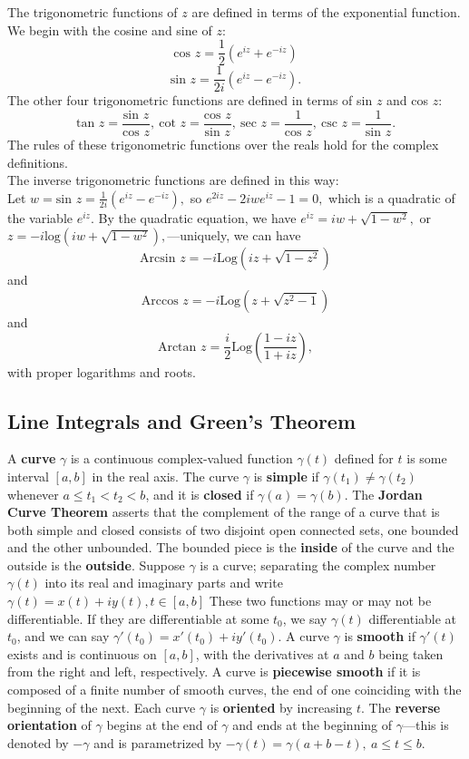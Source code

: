 \documentclass[12pt,letterpaper]{article}
\begin{document}
The trigonometric functions of \(z\) are defined in terms of the exponential function. We begin with the cosine and sine of \(z\): \[\text{cos } z = \frac{1}{2}(e^{iz} + e^{-iz})\] \[\text{sin } z = \frac{1}{2i}(e^{iz}-e^{-iz}).\] The other four trigonometric functions are defined in terms of sin \(z\) and cos \(z\): \[\text{tan } z= \frac{\text{sin } z}{\text{cos } z},\ \text{cot }z = \frac{\text{cos }z}{\text{sin }z},\ \text{sec }z = \frac{1}{\text{cos }z},\ \text{csc }z = \frac{1}{\text{sin }z}.\] The rules of these trigonometric functions over the reals hold for the complex definitions. \\

The inverse trigonometric functions are defined in this way: \\ 

Let \(w = \text{sin } z = \frac{1}{2i}(e^{iz} - e^{-iz}),\) so \(e^{2iz} - 2iwe^{iz} - 1 = 0,\) which is a quadratic of the variable \(e^{iz}\). By the quadratic equation, we have \(e^{iz} = iw + \sqrt{1-w^{2}},\) or \(z = -i\text{log}(iw + \sqrt{1-w^{2}}),\)---uniquely, we can have \[\text{Arcsin } z = -i\text{Log}(iz + \sqrt{1-z^{2}})\] and \[\text{Arccos } z = -i\text{Log}(z + \sqrt{z^{2} - 1})\] and \[\text{Arctan }z = \frac{i}{2}\text{Log}(\frac{1-iz}{1+iz}),\] with proper logarithms and roots.  

\subsection{Line Integrals and Green's Theorem}

A \textbf{curve} \(\gamma\) is a continuous complex-valued function \(\gamma(t)\) defined for \(t\) is some interval \([a,b]\) in the real axis. The curve \(\gamma\) is \textbf{simple} if \(\gamma(t_{1}) \neq \gamma(t_{2})\) whenever \(a \leq t_{1} < t_{2} < b\), and it is \textbf{closed} if \(\gamma(a) = \gamma(b)\). The \textbf{Jordan Curve Theorem} asserts that the complement of the range of a curve that is both simple and closed consists of two disjoint open connected sets, one bounded and the other unbounded. The bounded piece is the \textbf{inside} of the curve and the outside is the \textbf{outside}. Suppose \(\gamma\) is a curve; separating the complex number \(\gamma(t)\) into its real and imaginary parts and write \(\gamma(t) = x(t) + iy(t), t\in [a,b]\) These two functions may or may not be differentiable. If they are differentiable at some \(t_{0}\), we say \(\gamma(t)\) differentiable at \(t_{0}\), and we can say \(\gamma'(t_{0}) = x'(t_{0}) + iy'(t_{0})\).  A curve \(\gamma\) is \textbf{smooth} if \(\gamma'(t)\) exists and is continuous on \([a,b]\), with the derivatives at \(a\) and \(b\) being taken from the right and left, respectively. A curve is \textbf{piecewise smooth} if it is composed of a finite number of smooth curves, the end of one coinciding with the beginning of the next. Each curve \(\gamma\) is \textbf{oriented} by increasing \(t\). The \textbf{reverse orientation} of \(\gamma\) begins at the end of \(\gamma\) and ends at the beginning of \(\gamma\)---this is denoted by \(-\gamma\) and is parametrized by \(-\gamma(t) = \gamma(a + b - t),\ a \leq t \leq b\). \\
\end{document}
